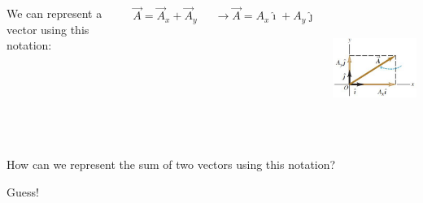 \documentclass[]{beamer}
\begin{document}
\begin{frame}




   \begin{columns}[c]
   \column{2in}  %

We can represent a vector using this notation:
\vspace{3mm}

\begin{equation*}
\vec{A}=\vec{A}_x+\vec{A}_y
\end{equation*}



\begin{equation*}
\rightarrow \vec{A}=A_x\hat{\imath}+A_y\hat{\jmath}
\end{equation*}



  
   \column{2in}




  \begin{center}
  \includegraphics[height=1.6in]{images/unit_vec_2.jpg}
\end{center}


   \end{columns}



 \end{frame}

\begin{frame}

How can we represent the sum of two vectors using this notation?

\vspace{3mm}

Guess! 


 \end{frame}
\end{document}
